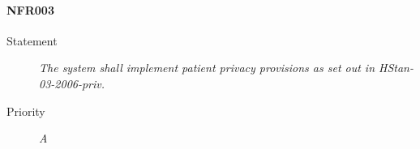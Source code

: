 \paragraph{NFR003}
\begin{description}
  \item [Statement] \textit{The system shall implement patient privacy
    provisions as set out in HStan-03-2006-priv.}
  \item [Priority] \textit{A}
\end{description}
